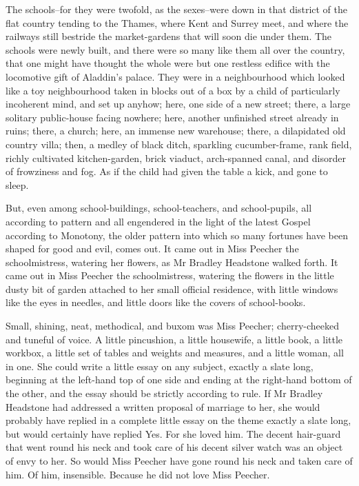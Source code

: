The schools--for they were twofold, as the sexes--were down in that
district of the flat country tending to the Thames, where Kent and
Surrey meet, and where the railways still bestride the market-gardens
that will soon die under them. The schools were newly built, and there
were so many like them all over the country, that one might have thought
the whole were but one restless edifice with the locomotive gift of
Aladdin’s palace. They were in a neighbourhood which looked like a toy
neighbourhood taken in blocks out of a box by a child of particularly
incoherent mind, and set up anyhow; here, one side of a new street;
there, a large solitary public-house facing nowhere; here, another
unfinished street already in ruins; there, a church; here, an immense
new warehouse; there, a dilapidated old country villa; then, a medley
of black ditch, sparkling cucumber-frame, rank field, richly cultivated
kitchen-garden, brick viaduct, arch-spanned canal, and disorder of
frowziness and fog. As if the child had given the table a kick, and gone
to sleep.

But, even among school-buildings, school-teachers, and school-pupils,
all according to pattern and all engendered in the light of the latest
Gospel according to Monotony, the older pattern into which so many
fortunes have been shaped for good and evil, comes out. It came out in
Miss Peecher the schoolmistress, watering her flowers, as Mr Bradley
Headstone walked forth. It came out in Miss Peecher the schoolmistress,
watering the flowers in the little dusty bit of garden attached to her
small official residence, with little windows like the eyes in needles,
and little doors like the covers of school-books.

Small, shining, neat, methodical, and buxom was Miss Peecher;
cherry-cheeked and tuneful of voice. A little pincushion, a little
housewife, a little book, a little workbox, a little set of tables and
weights and measures, and a little woman, all in one. She could write
a little essay on any subject, exactly a slate long, beginning at the
left-hand top of one side and ending at the right-hand bottom of the
other, and the essay should be strictly according to rule. If Mr Bradley
Headstone had addressed a written proposal of marriage to her, she would
probably have replied in a complete little essay on the theme exactly a
slate long, but would certainly have replied Yes. For she loved him. The
decent hair-guard that went round his neck and took care of his decent
silver watch was an object of envy to her. So would Miss Peecher have
gone round his neck and taken care of him. Of him, insensible. Because
he did not love Miss Peecher.

